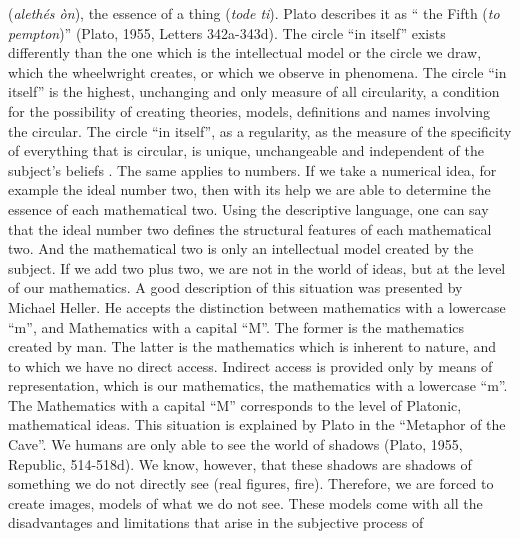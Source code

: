 \documentclass[a4paper]{article}
\begin{document}
(\textit{alethés òn}), the essence of a thing (\textit{tode ti}). Plato describes it as “%
the Fifth (\textit{to pempton})” \label{ref:RNDJLB7hWnVGd}(Plato, 1955, Letters 342a-343d). The circle “in itself”
exists differently than the one which is the intellectual model or the circle we draw, which the wheelwright creates,
or which we observe in phenomena. The circle “in itself” is the highest, unchanging and only measure of all
circularity, a condition for the possibility of creating theories, models, definitions and names %
involving the circular. The circle “in itself”, as a regularity, as the measure of the specificity of everything that is
circular, is unique, unchangeable and independent of the subject’s %
beliefs%
. The same applies to numbers. If we take a numerical idea, for example the ideal number two, then with its help we are
able to determine the essence of each mathematical two. Using the descriptive language, one can say that the ideal
number two defines the structural features of each mathematical two. And the mathematical two is only an intellectual
model created by the subject. If we add two plus two, we are not in the world of ideas, but at the level of our
mathematics. A good description of this situation was presented by Michael Heller. He accepts the distinction between
mathematics with a lowercase “m”, and Mathematics with a capital “M”. The former is the mathematics created by man. The
latter is the mathematics which is inherent to nature, and to which we have no direct access. Indirect access is
provided only by means of representation, which is our mathematics, the mathematics with a lowercase “m”. The
Mathematics with a capital “M” corresponds to the level of Platonic, mathematical ideas. This situation is explained by
Plato in the “Metaphor of the Cave”. We humans are only able to see the world of shadows
\label{ref:RNDwjC6IKbU9w}(Plato, 1955, Republic, 514-518d). We know, however, that these shadows are shadows of
something we do not directly see (real figures, fire). Therefore, we are forced to create images, models of what we do
not see. These models come with all the disadvantages and limitations that arise in the subjective process of
\end{document}
